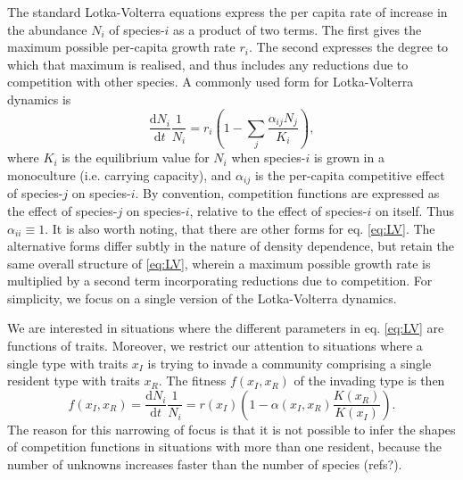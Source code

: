 \documentclass[a4paper,11pt]{article}
\newcommand{\ud}{\ensuremath{\mathrm{d}}}
\begin{document}
The standard Lotka-Volterra equations express the per capita rate of increase
in the abundance $N_i$ of species-$i$ as a product of two terms. The first
gives the maximum possible per-capita growth rate $r_i$. The second expresses
the degree to which that maximum is realised, and thus includes any reductions
due to competition with other species. A commonly used form for Lotka-Volterra dynamics
is
\begin{equation}
\label{eq:LV}
\frac{\ud N_i}{\ud t} \frac{1}{N_i} =  r_i \left(1 - \sum_j
                                      \frac{\alpha_{ij} N_j}{K_i}\right),
\end{equation}
where $K_i$ is the equilibrium value for $N_i$ when species-$i$ is grown in a
monoculture  (i.e. carrying capacity), and $\alpha_{ij}$ is the per-capita
competitive effect of species-$j$ on species-$i$. By convention, competition
functions are expressed as the effect of species-$j$ on species-$i$, relative
to the effect of species-$i$ on itself. Thus $\alpha_{ii}\equiv 1$. It is
also worth noting, that there are other forms for eq. \ref{eq:LV}. The alternative
forms differ subtly in the nature of density dependence, but retain the same
overall structure of \ref{eq:LV}, wherein a maximum possible growth rate is multiplied
by a second term incorporating reductions due to competition. For simplicity,
we focus on a single version of the Lotka-Volterra dynamics.

We are interested in situations where the different parameters in eq.
\ref{eq:LV} are functions  of traits. Moreover, we restrict our
attention to situations where a single type with traits
$x_I$ is trying to invade a community comprising a single resident type with
traits $x_R$.  The fitness $f(x_I, x_R)$ of the invading type is
then
\begin{equation}
  \label{eq:LVi}
   f(x_I, x_R) = \frac{\ud N_i}{\ud t} \frac{1}{N_i} =
    r(x_I)\left(1 - \alpha(x_I, x_R) \frac{K(x_R)}{K(x_I)}\right).
\end{equation}
The reason for this narrowing of focus is that it is not possible to
infer the shapes of competition functions in situations with more than one
resident, because the number of unknowns increases faster than the number of
species (refs?).
\end{document}
